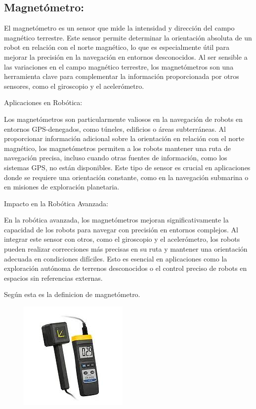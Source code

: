 \subsection{\textbf{Magnetómetro}:}

El magnetómetro es un sensor que mide la intensidad y dirección del campo magnético terrestre. Este sensor permite determinar la orientación absoluta de un robot en relación con el norte magnético, lo que es especialmente útil para mejorar la precisión en la navegación en entornos desconocidos. Al ser sensible a las variaciones en el campo magnético terrestre, los magnetómetros son una herramienta clave para complementar la información proporcionada por otros sensores, como el giroscopio y el acelerómetro.



Aplicaciones en Robótica:


Los magnetómetros son particularmente valiosos en la navegación de robots en entornos GPS-denegados, como túneles, edificios o áreas subterráneas. Al proporcionar información adicional sobre la orientación en relación con el norte magnético, los magnetómetros permiten a los robots mantener una ruta de navegación precisa, incluso cuando otras fuentes de información, como los sistemas GPS, no están disponibles. Este tipo de sensor es crucial en aplicaciones donde se requiere una orientación constante, como en la navegación submarina o en misiones de exploración planetaria.


Impacto en la Robótica Avanzada:


En la robótica avanzada, los magnetómetros mejoran significativamente la capacidad de los robots para navegar con precisión en entornos complejos. Al integrar este sensor con otros, como el giroscopio y el acelerómetro, los robots pueden realizar correcciones más precisas en su ruta y mantener una orientación adecuada en condiciones difíciles. Esto es esencial en aplicaciones como la exploración autónoma de terrenos desconocidos o el control preciso de robots en espacios sin referencias externas.

Según \cite{park2017design} esta es la definicion de magnetómetro.
\begin{figure}[h]
	\centering
	\includegraphics[width=0.3\linewidth]{img/magnetometro}
	\caption{}
	\label{fig:magnetometro}
\end{figure}
